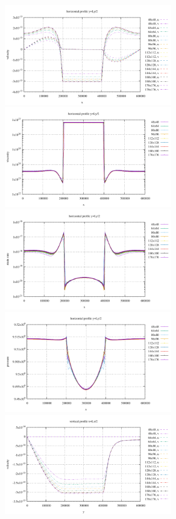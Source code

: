 \begin{center}
\includegraphics[width=7.3cm]{python_codes/fieldstone_87/results/experiment_06/horizontal_profile_uv}
\includegraphics[width=7.3cm]{python_codes/fieldstone_87/results/experiment_06/horizontal_profile_eta}\\
\includegraphics[width=7.3cm]{python_codes/fieldstone_87/results/experiment_06/horizontal_profile_sr}
\includegraphics[width=7.3cm]{python_codes/fieldstone_87/results/experiment_06/horizontal_profile_p}\\
\includegraphics[width=7.3cm]{python_codes/fieldstone_87/results/experiment_06/vertical_profile_uv}

\end{center}
